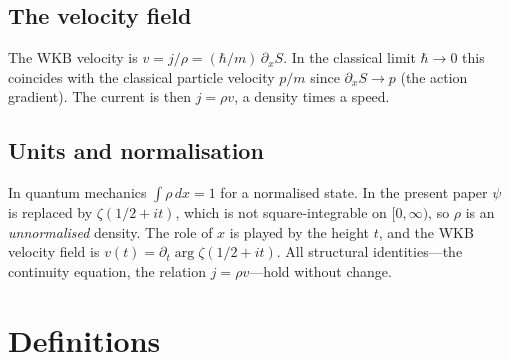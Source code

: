 \documentclass[11pt]{article}
\theoremstyle{plain}
\theoremstyle{definition}
\theoremstyle{remark}
\begin{document}
\subsection*{The velocity field}

The WKB velocity is $v = j/\rho = (\hbar/m)\,\partial_x S$.
In the classical limit $\hbar\to 0$ this coincides with the classical
particle velocity $p/m$ since $\partial_x S \to p$ (the action
gradient). The current is then $j = \rho v$, a density times a speed.

\subsection*{Units and normalisation}

In quantum mechanics $\int \rho\,dx = 1$ for a normalised state.
In the present paper $\psi$ is replaced by $\zeta(1/2+it)$, which is
not square-integrable on $[0,\infty)$, so $\rho$ is an \emph{unnormalised}
density. The role of $x$ is played by the height $t$, and the WKB
velocity field is $v(t) = \partial_t\arg\zeta(1/2+it)$. All
structural identities---the continuity equation, the relation $j =
\rho v$---hold without change.

\section{Definitions}
\end{document}
